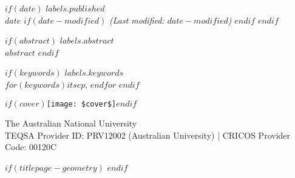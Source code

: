 \begin{minipage}[b][\textheight][s]{\textwidth}
\begin{titlepagebox}

$if(date)$
{\textcolor{anugold}{\MakeUppercase{$labels.published$}}}\\ $date$
$if(date-modified)$
{\itshape{(Last modified: $date-modified$)}}
$endif$
\vspace{3mm}
$endif$

$if(abstract)$
\textcolor{anugold}{\MakeUppercase{$labels.abstract$}}\\
$abstract$
$endif$
\vspace{3mm}

$if(keywords)$
{\textcolor{anugold}{\MakeUppercase{$labels.keywords$}}}\\
$for(keywords)$$it$$sep$, $endfor$
$endif$

\end{titlepagebox}

\vspace{2\baselineskip}






\vfill

$if(cover)$\texttt{[image: \$cover\$]}$endif$

\vspace{1\baselineskip}

The Australian National University\\{\footnotesize TEQSA Provider ID: PRV12002 (Australian University) | CRICOS Provider Code: 00120C}

\end{minipage}
$if(titlepage-geometry)$
\restoregeometry
$endif$
